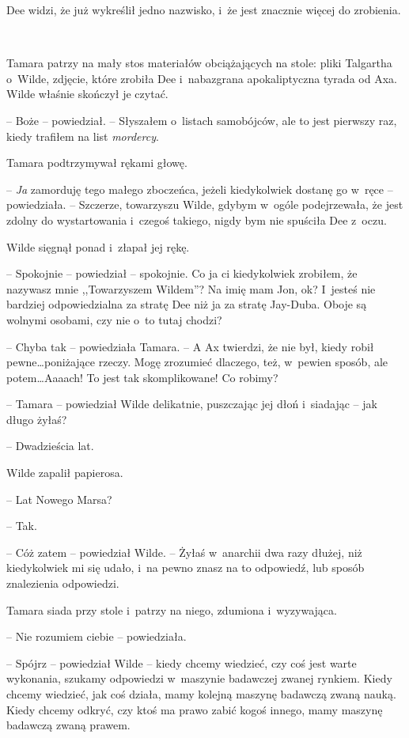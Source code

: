 \documentclass[oneside,polish,11pt,sfheadings]{mwbk}
\begin{document}
Dee widzi, że już wykreślił jedno nazwisko, i~że jest znacznie więcej do
zrobienia.

~

Tamara patrzy na mały stos materiałów obciążających na stole: pliki
Talgartha o~Wilde, zdjęcie, które zrobiła Dee i~nabazgrana
apokaliptyczna tyrada od Axa. Wilde właśnie skończył je czytać.

-- Boże -- powiedział. -- Słyszałem o~listach samobójców, ale to jest
pierwszy raz, kiedy trafiłem na list \emph{mordercy}.

Tamara podtrzymywał rękami głowę.

-- \emph{Ja} zamorduję tego małego zboczeńca, jeżeli kiedykolwiek dostanę
go w~ręce -- powiedziała. -- Szczerze, towarzyszu Wilde, gdybym w~ogóle
podejrzewała, że jest zdolny do wystartowania i~czegoś takiego, nigdy
bym nie spuściła Dee z~oczu.

Wilde sięgnął ponad i~złapał jej rękę.

-- Spokojnie -- powiedział -- spokojnie. Co ja ci kiedykolwiek zrobiłem, że
nazywasz mnie ,,Towarzyszem Wildem''? Na imię mam Jon, ok? I~jesteś nie
bardziej odpowiedzialna za stratę Dee niż ja za stratę Jay-Duba. Oboje
są wolnymi osobami, czy nie o~to tutaj chodzi?

-- Chyba tak -- powiedziała Tamara. -- A Ax twierdzi, że nie był, kiedy
robił pewne\ldots poniżające rzeczy. Mogę zrozumieć dlaczego, też, w~pewien
sposób, ale potem\ldots Aaaach! To jest tak skomplikowane! Co robimy?

-- Tamara -- powiedział Wilde delikatnie, puszczając jej dłoń i~siadając -- jak długo żyłaś?

-- Dwadzieścia lat.

Wilde zapalił papierosa.

-- Lat Nowego Marsa?

-- Tak.

-- Cóż zatem -- powiedział Wilde. -- Żyłaś w~anarchii dwa razy dłużej, niż
kiedykolwiek mi się udało, i~na pewno znasz na to odpowiedź, lub sposób
znalezienia odpowiedzi.

Tamara siada przy stole i~patrzy na niego, zdumiona i~wyzywająca.

-- Nie rozumiem ciebie -- powiedziała.

-- Spójrz -- powiedział Wilde -- kiedy chcemy wiedzieć, czy coś jest warte
wykonania, szukamy odpowiedzi w~maszynie badawczej zwanej rynkiem. Kiedy
chcemy wiedzieć, jak coś działa, mamy kolejną maszynę badawczą zwaną
nauką. Kiedy chcemy odkryć, czy ktoś ma prawo zabić kogoś innego, mamy
maszynę badawczą zwaną prawem.
\end{document}
